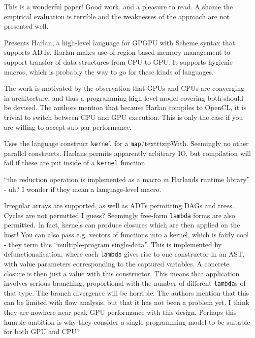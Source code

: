 \documentclass[a4paper, oneside, final]{memoir}
\begin{document}
This is a wonderful paper!  Good work, and a pleasure to read.  A
shame the empirical evaluation is terrible and the weaknesses of the
approach are not presented well.

Presents Harlan, a high-level language for GPGPU with Scheme syntax
that supports ADTs.  Harlan makes use of region-based memory
management to support transfor of data structures from CPU to GPU.  It
supports hygienic macros, which is probably the way to go for these
kinds of languages.

The work is motivated by the observation that GPUs and CPUs are
converging in architecture, and thus a programming high-level model
covering both should be devised.  The authors mention that because
Harlan compiles to OpenCL, it is trivial to switch between CPU and GPU
execution.  This is only the case if you are willing to accept sub-par
performance.

Uses the language construct \texttt{kernel} for a
\texttt{map}/texttt{zipWith}.  Seemingly no other parallel constructs.
Harlans permits apparently arbitrary IO, but compilation will fail if
these are put inside of a \texttt{kernel} function.

``the reduction operation is implemented as a macro in Harlands
runtime library'' - uh?  I wonder if they mean a language-level macro.

Irregular arrays are supported, as well as ADTs permitting DAGs and
trees.  Cycles are not permitted I guess?  Seemingly free-form
\texttt{lambda} forms are also permitted.  In fact, kernels can
produce closures which are then applied on the host!  You can also
pass e.g. vectors of functions into a kernel, which is fairly cool -
they term this ``multiple-program single-data''.  This is implemented
by defunctionalisation, where each \texttt{lambda} gives rise to one
constructor in an AST, with value parameters corresponding to the
captured variables.  A concrete closure is then just a value with this
constructor.  This means that application involves serious branching,
proportional with the number of different \texttt{lambda}s of that
type.  The branch divergence will be horrible.  The authors mention
that this can be limited with flow analysis, but that it has not been
a problem yet.  I think they are nowhere near peak GPU performance
with this design.  Perhaps this humble ambition is why they consider a
single programming model to be suitable for both GPU and CPU?
\end{document}
